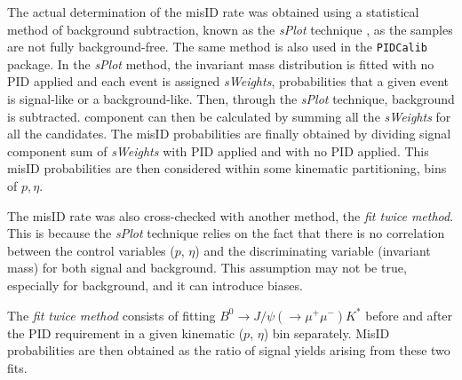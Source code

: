 The actual determination of the misID rate was obtained using a statistical method of background subtraction, known as the \textit{sPlot} technique \cite{sPlot}, as the samples are not fully background-free. The same method is also used in the \texttt{PIDCalib} package. In the \textit{sPlot} method, the invariant mass distribution is fitted with no \gls{PID} applied and each event is assigned \textit{sWeights}, probabilities that a given event is \DIFdelbegin {}\DIFdelend signal-like or a background-like. Then, through the \textit{sPlot} technique, background is subtracted. \DIFdelbegin {}\DIFdelend \DIFaddbegin {}\DIFaddend component can then be calculated by summing all the \textit{sWeights} for all the candidates. The misID probabilities are finally obtained by dividing \DIFdelbegin {}\DIFdelend signal component sum of \textit{sWeights} with \gls{PID} applied and \DIFaddbegin {}\DIFaddend with no \gls{PID} applied. This misID probabilities are then considered within some kinematic partitioning, bins of $p,\eta$. 

\color{black}

The misID rate was also cross-checked with another method, the \textit{fit twice method}. This is because the \textit{sPlot} technique relies on the fact that there is no correlation between the control variables ($p$, $\eta$) and the discriminating variable (invariant mass) for both signal and background. This assumption may not be true, especially for background, and it can introduce biases.

The \textit{fit twice method} consists of fitting $B^{0} \rightarrow J/\psi(\rightarrow \mu^{+} \mu^{-}) K^{*}$ before and after the \gls{PID} requirement in a given kinematic ($p$, $\eta$) bin separately. MisID probabilities are then obtained as the ratio of signal yields arising from these two fits.


